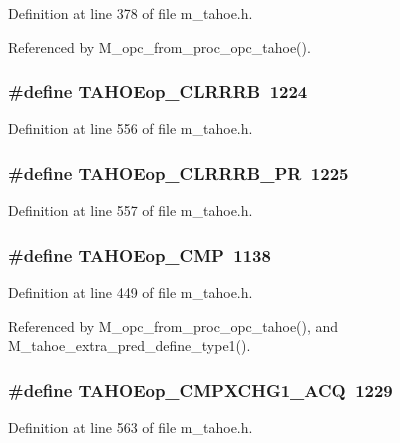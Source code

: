 Definition at line 378 of file m\_\-tahoe.h.

Referenced by M\_\-opc\_\-from\_\-proc\_\-opc\_\-tahoe().
\subsubsection{\setlength{\rightskip}{0pt plus 5cm}\#define TAHOEop\_\-CLRRRB~1224}\label{m__tahoe_8h_2253019ccdee24ff9a03a50c950af0f8}




Definition at line 556 of file m\_\-tahoe.h.
\subsubsection{\setlength{\rightskip}{0pt plus 5cm}\#define TAHOEop\_\-CLRRRB\_\-PR~1225}\label{m__tahoe_8h_7619026eebc134666a538388c87b8ecd}




Definition at line 557 of file m\_\-tahoe.h.
\subsubsection{\setlength{\rightskip}{0pt plus 5cm}\#define TAHOEop\_\-CMP~1138}\label{m__tahoe_8h_75dc7c91037831d2237586e86f967380}




Definition at line 449 of file m\_\-tahoe.h.

Referenced by M\_\-opc\_\-from\_\-proc\_\-opc\_\-tahoe(), and M\_\-tahoe\_\-extra\_\-pred\_\-define\_\-type1().
\subsubsection{\setlength{\rightskip}{0pt plus 5cm}\#define TAHOEop\_\-CMPXCHG1\_\-ACQ~1229}\label{m__tahoe_8h_3a069dcc40f829ab18cc4b95ece0938f}




Definition at line 563 of file m\_\-tahoe.h.
